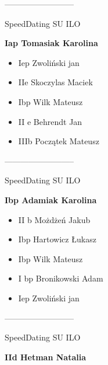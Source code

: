 \documentclass[a4paper,10pt]{article}
\begin{document}
\begin{multicols}{3}
\begin{minipage}[l]{\textwidth}
\begin{itemize}
    \end{itemize}



\end{minipage}



\begin{minipage}[l]{\textwidth}
--------------------------

  \footnotesize{SpeedDating SU ILO}

  \bfseries{Iap Tomasiak Karolina}

  \begin{itemize}
    \item Iep Zwoliński jan
    \item IIe Skoczylas Maciek
    \item Ibp Wilk Mateusz
    \item II e Behrendt Jan
    \item IIIb Początek Mateusz

    \end{itemize}



\end{minipage}



\begin{minipage}[l]{\textwidth}
--------------------------

  \footnotesize{SpeedDating SU ILO}

  \bfseries{Ibp Adamiak Karolina}

  \begin{itemize}
    \item II b Możdżeń Jakub
    \item Ibp Hartowicz Łukasz
    \item Ibp Wilk Mateusz
    \item I bp Bronikowski Adam
    \item Iep Zwoliński jan

    \end{itemize}



\end{minipage}



\begin{minipage}[l]{\textwidth}
--------------------------

  \footnotesize{SpeedDating SU ILO}

  \bfseries{IId Hetman Natalia}


\end{minipage}
\end{multicols}
\end{document}
